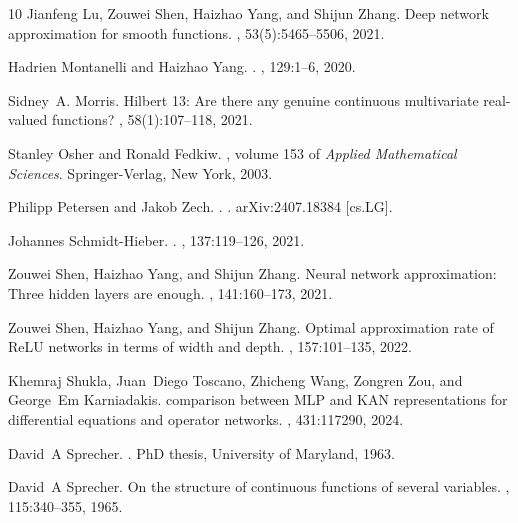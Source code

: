 \documentclass[10pt,reqno,final]{amsart}
\theoremstyle{remark}
\theoremstyle{definition}
\begin{document}
\begin{thebibliography}{10}
Jianfeng Lu, Zouwei Shen, Haizhao Yang, and Shijun Zhang.
\newblock Deep network approximation for smooth functions.
, 53(5):5465--5506, 2021.

Hadrien Montanelli and Haizhao Yang.
.
, 129:1--6, 2020.

Sidney~A. Morris.
\newblock Hilbert 13: {A}re there any genuine continuous multivariate
  real-valued functions?
, 58(1):107--118,
  2021.

Stanley Osher and Ronald Fedkiw.
, volume 153 of
  {\em Applied Mathematical Sciences}.
\newblock Springer-Verlag, New York, 2003.

Philipp Petersen and Jakob Zech.
.
.
\newblock arXiv:2407.18384 [cs.LG].

Johannes Schmidt-Hieber.
.
, 137:119--126, 2021.

Zouwei Shen, Haizhao Yang, and Shijun Zhang.
\newblock Neural network approximation: {Three} hidden layers are enough.
, 141:160--173, 2021.

Zouwei Shen, Haizhao Yang, and Shijun Zhang.
\newblock Optimal approximation rate of {ReLU} networks in terms of width and
  depth.
, 157:101--135,
  2022.

Khemraj Shukla, Juan~Diego Toscano, Zhicheng Wang, Zongren Zou, and George~Em
  Karniadakis.
 comparison between {MLP} and {KAN}
  representations for differential equations and operator networks.
,
  431:117290, 2024.

David~A Sprecher.
.
\newblock PhD thesis, University of Maryland, 1963.

David~A Sprecher.
\newblock On the structure of continuous functions of several variables.
,
  115:340--355, 1965.


\end{thebibliography}
\end{document}
